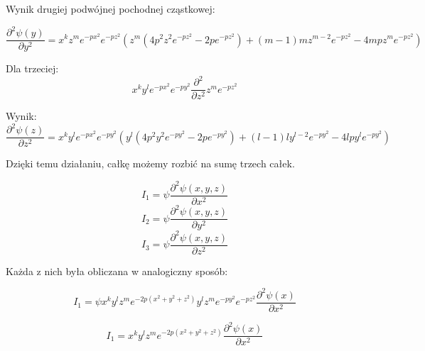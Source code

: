 Wynik drugiej podwójnej pochodnej cząstkowej:

\begin{equation}
	\frac{\partial^2\psi(y)}{\partial y^2} =  x^k z^m e^{-px^2}e^{-pz^2} \left( z^m (4 p^2 z^2 e^{-p z^2}-2 p e^{-p z^2})+(m-1) m z^{m-2} e^{-p z^2}-4 m p z^m e^{-p z^2} \right)
\end{equation}

Dla trzeciej:
\begin{equation}
	x^k y^l e^{-px^2}e^{-py^2} \frac{\partial^2}{\partial z^2} z^m e^{-pz^2}
\end{equation}

Wynik:
\begin{equation}
	\frac{\partial^2\psi(z)}{\partial z^2} = x^k y^l e^{-px^2}e^{-py^2} \left( y^l (4 p^2 y^2 e^{-p y^2}-2 p e^{-p y^2})+(l-1) l y^{l-2} e^{-p y^2}-4 l p y^l e^{-p y^2}\right)
\end{equation}

Dzięki temu działaniu, całkę możemy rozbić na sumę trzech całek.

\begin{equation}
	I_1 = \psi \frac{\partial^2\psi(x,y,z)}{\partial x^2}
\end{equation}
\begin{equation}
	I_2 = \psi \frac{\partial^2\psi(x,y,z)}{\partial y^2}
\end{equation}
\begin{equation}
	I_3 = \psi \frac{\partial^2\psi(x,y,z)}{\partial z^2}
\end{equation}

Każda z nich była obliczana w analogiczny sposób:

\begin{equation}
	I_1 = \psi x^k y^l z^m e^{-2p(x^2+y^2+z^2)} y^l z^m e^{-py^2}e^{-pz^2} \frac{\partial^2\psi(x)}{\partial x^2}
\end{equation}

\begin{equation}
	I_1 = x^k y^l z^m e^{-2p(x^2+y^2+z^2)} \frac{\partial^2\psi(x)}{\partial x^2}
\end{equation}



